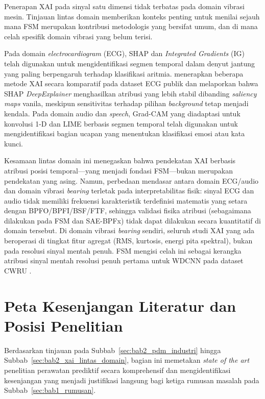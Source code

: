 {\color{blue}Penerapan XAI pada sinyal satu dimensi tidak terbatas pada domain vibrasi mesin.
Tinjauan lintas domain memberikan konteks penting untuk menilai sejauh mana FSM
merupakan kontribusi metodologis yang bersifat umum, dan di mana celah spesifik
domain vibrasi yang belum terisi.}

{\color{blue}Pada domain \emph{electrocardiogram} (ECG), SHAP dan \emph{Integrated Gradients}
(IG) telah digunakan untuk mengidentifikasi segmen temporal dalam denyut jantung
yang paling berpengaruh terhadap klasifikasi aritmia.
 menerapkan beberapa metode XAI
secara komparatif pada dataset ECG publik dan melaporkan bahwa SHAP
\emph{DeepExplainer} menghasilkan atribusi yang lebih stabil dibanding
\emph{saliency maps} vanila, meskipun sensitivitas terhadap pilihan
\emph{background} tetap menjadi kendala.
Pada domain audio dan \emph{speech}, Grad-CAM yang diadaptasi untuk konvolusi
1-D  dan LIME berbasis segmen temporal telah digunakan
untuk mengidentifikasi bagian ucapan yang menentukan klasifikasi emosi atau
kata kunci.}

{\color{blue}Kesamaan lintas domain ini menegaskan bahwa pendekatan XAI berbasis atribusi
posisi temporal---yang menjadi fondasi FSM---bukan merupakan pendekatan yang
asing. Namun, perbedaan mendasar antara domain ECG/audio dan domain vibrasi
\emph{bearing} terletak pada interpretabilitas fisik: sinyal ECG dan audio
tidak memiliki frekuensi karakteristik terdefinisi matematis yang setara
dengan BPFO/BPFI/BSF/FTF, sehingga validasi fisika atribusi (sebagaimana
dilakukan pada FSM dan SAE-BPFx) tidak dapat dilakukan secara kuantitatif
di domain tersebut.
Di domain vibrasi \emph{bearing} sendiri, seluruh studi XAI yang ada beroperasi
di tingkat fitur agregat (RMS, kurtosis, energi pita spektral), bukan pada
resolusi sinyal mentah penuh.
FSM mengisi celah ini sebagai kerangka atribusi sinyal mentah resolusi penuh
pertama untuk WDCNN pada dataset CWRU .}

\section{Peta Kesenjangan Literatur dan Posisi Penelitian}
\label{sec:bab2_gap_literatur}

{\color{blue}Berdasarkan tinjauan pada Subbab~\ref{sec:bab2_pdm_industri}
hingga Subbab~\ref{sec:bab2_xai_lintas_domain}, bagian ini memetakan
\emph{state of the art} penelitian perawatan prediktif secara komprehensif
dan mengidentifikasi kesenjangan yang menjadi justifikasi langsung bagi
ketiga rumusan masalah pada Subbab~\ref{sec:bab1_rumusan}.}

